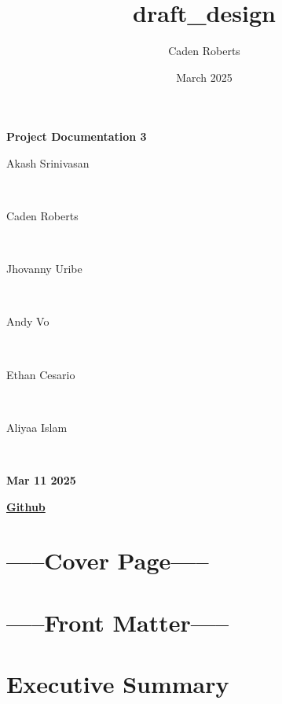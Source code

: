 \documentclass{article}
\title{draft_design}
\author{Caden Roberts}
\date{March 2025}
\begin{document}
\begin{titlepage}
    \centering
    \vfill
    {\Huge \bfseries Project Documentation 3\par}
    \vspace{1.5cm}
    {\Huge
        Akash Srinivasan \par \ \par
        Caden Roberts \par \ \par
        Jhovanny Uribe \par \ \par
        Andy Vo \par \ \par
        Ethan Cesario \par \ \par
        Aliyaa Islam \par \ \par
    }
    \vspace{1cm}
    {\Huge \bfseries Mar 11 2025\par}
    \vspace{1.5cm}
    \href{https://github.com/jhovuribe/Physical-Therapy-Hand-Rehabilitation-Device/}{\Huge \bfseries Github}
\end{titlepage}

\section{\bf{-----Cover Page-----}}


\section{\bf{-----Front Matter-----}}
\section{Executive Summary}
\end{document}
